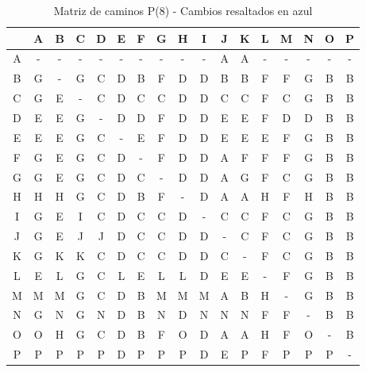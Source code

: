 \documentclass[12pt]{article}
\begin{document}
\begin{table}[h!]
\centering
\begin{tabular}{|c|c|c|c|c|c|c|c|c|c|c|c|c|c|c|c|c|}
\hline
 & A & B & C & D & E & F & G & H & I & J & K & L & M & N & O & P \\\hline
A & - & - & - & - & - & - & - & - & - & A & A & - & - & - & - & - \\\hline
B & G & - & G & C & D & B & F & D & D & B & B & F & F & G & B & B \\\hline
C & G & E & - & C & D & C & C & D & D & C & C & F & C & G & B & B \\\hline
D & E & E & G & - & D & D & F & D & D & E & E & F & D & D & B & B \\\hline
E & E & E & G & C & - & E & F & D & D & E & E & E & F & G & B & B \\\hline
F & G & E & G & C & D & - & F & D & D & A & F & F & F & G & B & B \\\hline
G & G & E & G & C & D & C & - & D & D & A & G & F & C & G & B & B \\\hline
H & H & H & G & C & D & B & F & - & D & A & A & H & F & H & B & B \\\hline
I & G & E & I & C & D & C & C & D & - & C & C & F & C & G & B & B \\\hline
J & G & E & J & J & D & C & C & D & D & - & C & F & C & G & B & B \\\hline
K & G & K & K & C & D & C & C & D & D & C & - & F & C & G & B & B \\\hline
L & E & L & G & C & L & E & L & L & D & E & E & - & F & G & B & B \\\hline
M & M & M & G & C & D & B & M & M & M & A & B & \cellcolor{lightblue} H & - & G & B & B \\\hline
N & G & N & G & N & D & B & N & D & N & N & N & F & F & - & B & B \\\hline
O & O & \cellcolor{lightblue} H & \cellcolor{lightblue} G & \cellcolor{lightblue} C & \cellcolor{lightblue} D & \cellcolor{lightblue} B & \cellcolor{lightblue} F & O & \cellcolor{lightblue} D & A & A & \cellcolor{lightblue} H & \cellcolor{lightblue} F & O & - & \cellcolor{lightblue} B \\\hline
P & P & P & P & P & D & P & P & P & D & E & P & F & P & P & P & - \\\hline
\end{tabular}
\caption{Matriz de caminos P(8) - Cambios resaltados en azul}
\end{table}
\end{document}
